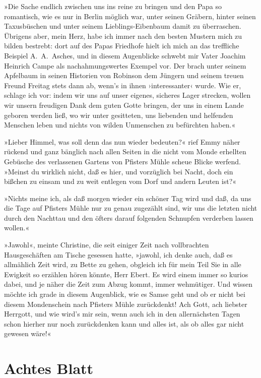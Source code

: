»Die Sache endlich zwischen uns ins reine zu bringen und den Papa
so romantisch, wie es nur in Berlin möglich war, unter seinen
Gräbern, hinter seinen Taxusbüschen und unter seinem
Lieblings-Eibenbaum damit zu überraschen. Übrigens aber, mein Herz,
habe ich immer nach den besten Mustern mich zu bilden bestrebt:
dort auf des Papas Friedhofe hielt ich mich an das treffliche
Beispiel A.~A.~Asches, und in diesem Augenblicke schwebt mir Vater
Joachim Heinrich Campe als nachahmungswertes Exempel vor. Der brach
unter seinem Apfelbaum in seinen Historien von Robinson dem Jüngern
und seinem treuen Freund Freitag stets dann ab, wenn's in ihnen
›interessanter‹ wurde. Wie er, schlage ich vor: indem wir uns auf
unser eigenes, sicheres Lager strecken, wollen wir unsern freudigen
Dank dem guten Gotte bringen, der uns in einem Lande geboren werden
ließ, wo wir unter gesitteten, uns liebenden und helfenden Menschen
leben und nichts von wilden Unmenschen zu befürchten haben.«

»Lieber Himmel, was soll denn das nun wieder bedeuten?« rief Emmy
näher rückend und ganz bänglich nach allen Seiten in die nicht vom
Monde erhellten Gebüsche des verlassenen Gartens von Pfisters Mühle
scheue Blicke werfend. »Meinst du wirklich nicht, daß es hier, und
vorzüglich bei Nacht, doch ein bißchen zu einsam und zu weit
entlegen vom Dorf und andern Leuten ist?«

»Nichts meine ich, als daß morgen wieder ein schöner Tag wird und
daß, da uns die Tage auf Pfisters Mühle nur zu genau zugezählt
sind, wir uns die letzten nicht durch den Nachttau und den öfters
darauf folgenden Schnupfen verderben lassen wollen.«

»Jawohl«, meinte Christine, die seit einiger Zeit nach vollbrachten
Hausgeschäften am Tische gesessen hatte, »jawohl, ich denke auch,
daß es allmählich Zeit wird, zu Bette zu gehen, obgleich ich für
mein Teil Sie in alle Ewigkeit so erzählen hören könnte, Herr
Ebert. Es wird einem immer so kurios dabei, und je näher die Zeit
zum Abzug kommt, immer wehmütiger. Und wissen möchte ich grade in
diesem Augenblick, wie es Samse geht und ob er nicht bei diesem
Mondenschein nach Pfisters Mühle zurückdenkt! Ach Gott, ach
liebster Herrgott, und wie wird's mir sein, wenn auch ich in den
allernächsten Tagen schon hierher nur noch zurückdenken kann und
alles ist, als ob alles gar nicht gewesen wäre!«

\section{Achtes Blatt}

